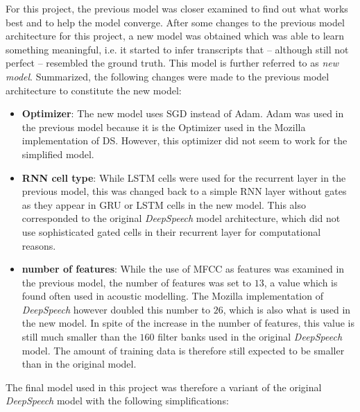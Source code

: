 For this project, the previous model was closer examined to find out what works best and to help the model converge. After some changes to the previous model architecture for this project, a new model was obtained which was able to learn something meaningful, i.e. it started to infer transcripts that -- although still not perfect -- resembled the ground truth. This model is further referred to as \textit{new model}. Summarized, the following changes were made to the previous model architecture to constitute the new model:

\begin{itemize}
	\item \textbf{Optimizer}: The new model uses \ac{SGD} instead of Adam. Adam was used in the previous model because it is the Optimizer used in the Mozilla implementation of \ac{DS}. However, this optimizer did not seem to work for the simplified model.
	\item \textbf{RNN cell type}: While \ac{LSTM} cells were used for the recurrent layer in the previous model, this was changed back to a simple RNN layer without gates as they appear in \ac{GRU} or \ac{LSTM} cells in the new model. This also corresponded to the original \textit{DeepSpeech} model architecture, which did not use sophisticated gated cells in their recurrent layer for computational reasons.
	\item \textbf{number of features}: While the use of \ac{MFCC} as features was examined in the previous model, the number of features was set to $13$, a value which is found often used in acoustic modelling. The Mozilla implementation of \textit{DeepSpeech} however doubled this number to $26$, which is also what is used in the new model. In spite of the increase in the number of features, this value is still much smaller than the $160$ filter banks used in the original \textit{DeepSpeech} model. The amount of training data is therefore still expected to be smaller than in the original model.
\end{itemize}

The final model used in this project was therefore a variant of the original \textit{DeepSpeech} model with the following simplifications:

